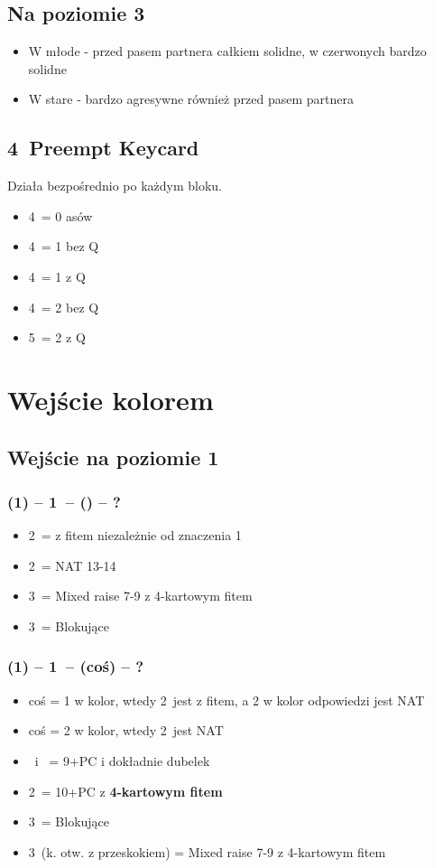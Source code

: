 \documentclass[12pt, a4paper]{article}
\begin{document}
\subsection*{Na poziomie 3}
\begin{itemize}
    \item W młode - przed pasem partnera całkiem solidne, w czerwonych bardzo solidne
    \item W stare - bardzo agresywne również przed pasem partnera
\end{itemize}

\subsection*{4\clubs\ Preempt Keycard}
Działa bezpośrednio po każdym bloku.
\begin{itemize}
    \item 4\diams\ = 0 asów
    \item 4\hearts\ = 1 bez Q
    \item 4\spades\ = 1 z Q
    \item 4\nt\ = 2 bez Q
    \item 5\clubs\ = 2 z Q
\end{itemize}


\pagebreak
\section{Wejście kolorem}
\subsection*{Wejście na poziomie 1}
\subsubsection*{(1\clubs) -- 1\hearts\ -- (\passx) -- ?}
\begin{itemize}
    \item 2\clubs\ = z fitem niezależnie od znaczenia 1\clubs
    \item 2\nt\ = NAT 13-14
    \item 3\clubs\ = Mixed raise 7-9 z 4-kartowym fitem
    \item 3\hearts\ = Blokujące
\end{itemize}

\subsubsection*{(1\clubs) -- 1\hearts\ -- (coś) -- ?}
\begin{itemize}
    \item coś = 1 w kolor, wtedy 2\clubs\ jest z fitem, a 2 w kolor odpowiedzi jest NAT
    \item coś = 2 w kolor, wtedy 2\clubs\ jest NAT
    \item \dbl\ i \rdbl\ = 9+PC i dokładnie dubelek \hearts
    \item 2\nt\ = 10+PC z \textbf{4-kartowym fitem}
    \item 3\hearts\ = Blokujące
    \item 3\clubs\ (k. otw. z przeskokiem) = Mixed raise 7-9 z 4-kartowym fitem
\end{itemize}
\end{document}
